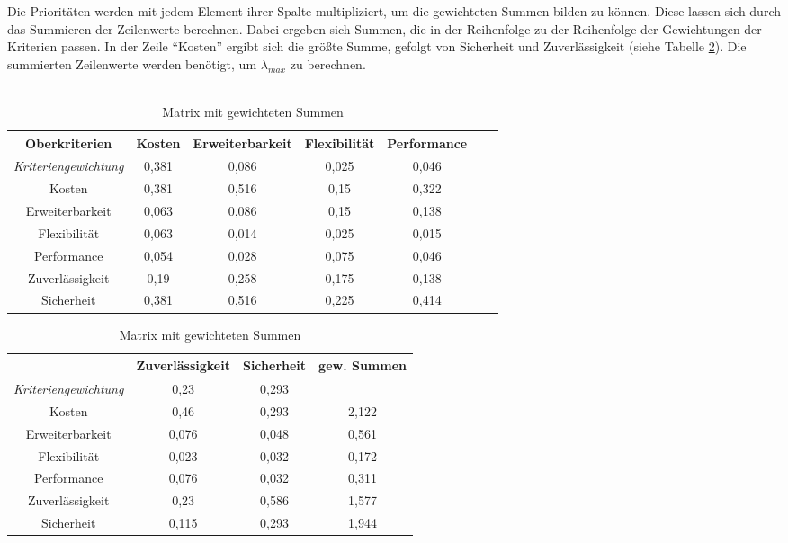 Die Prioritäten werden mit jedem Element ihrer Spalte multipliziert, um die gewichteten Summen bilden zu können. Diese lassen sich durch das Summieren der Zeilenwerte berechnen. Dabei ergeben sich Summen, die in der Reihenfolge zu der Reihenfolge der Gewichtungen der Kriterien passen. In der Zeile \enquote{Kosten} ergibt sich die größte Summe, gefolgt von Sicherheit und Zuverlässigkeit (siehe Tabelle \ref{all4}). Die summierten Zeilenwerte werden benötigt, um $\lambda_{max}$ zu berechnen.\\ \\
\begin{table}[h!]
	\centering
	\begin{tabular}{c|cccccc}
		Oberkriterien   & Kosten			 & Erweiterbarkeit & Flexibilität & Performance   \\ 
		\hline
\textit{Kriteriengewichtung}& 0,381   &   0,086    &       0,025      &      0,046      \\
\hline
		Kosten          & 0,381    	  &   0,516    &       0,15      &      0,322     \\
		Erweiterbarkeit &   0,063     & 0,086      &       0,15      &      0,138      \\
		Flexibilität    &   0,063     &  0,014   & 0,025           &      0,015      \\		
		Performance     &    0,054    &  0,028   &        0,075      & 0,046          \\		
		Zuverlässigkeit &   0,19    &    0,258    &        0,175     &      0,138       \\		
		Sicherheit      &    0,381   &   0,516     &        0,225     &       0,414            
	\end{tabular}
	\begin{tabular}{c|cc|c}
		&	Zuverlässigkeit & Sicherheit  &gew. Summen\\ 
		\hline
		\textit{Kriteriengewichtung}         &        0,23        &        0,293  &  \\
		\hline
		Kosten          &        0,46        &        0,293 &  2,122 \\
		Erweiterbarkeit &        0,076       &       0,048  & 0,561 \\
		Flexibilität    &       0,023        &     0,032   &   0,172\\		
		Performance     &       0,076        &      0,032   & 0,311  \\		
		Zuverlässigkeit & 0,23             &      0,586   &   1,577 \\		
		Sicherheit      &        0,115     & 0,293        & 1,944\\
	\end{tabular}
	\caption{Matrix mit gewichteten Summen}
	\label{all4}
\end{table}\\
